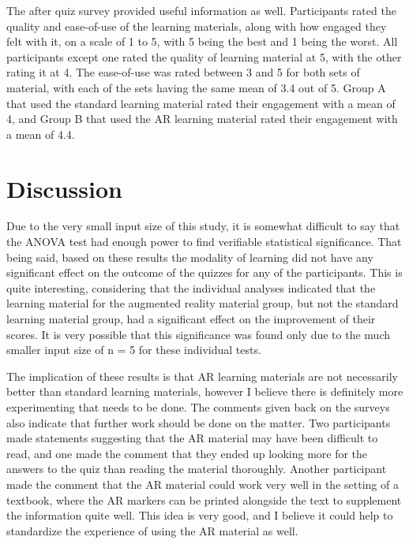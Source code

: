 \documentclass[sigconf]{acmart}
\begin{document}
The after quiz survey provided useful information as well. Participants rated the quality and ease-of-use of the learning materials, along with how engaged they felt with it, on a scale of 1 to 5, with 5 being the best and 1 being the worst. All participants except one rated the quality of learning material at 5, with the other rating it at 4. The ease-of-use was rated between 3 and 5 for both sets of material, with each of the sets having the same mean of 3.4 out of 5. Group A that used the standard learning material rated their engagement with a mean of 4, and Group B that used the AR learning material rated their engagement with a mean of 4.4.

\section{Discussion}
Due to the very small input size of this study, it is somewhat difficult to say that the ANOVA test had enough power to find verifiable statistical significance. That being said, based on these results the modality of learning did not have any significant effect on the outcome of the quizzes for any of the participants. This is quite interesting, considering that the individual analyses indicated that the learning material for the augmented reality material group, but not the standard learning material group, had a significant effect on the improvement of their scores. It is very possible that this significance was found only due to the much smaller input size of n = 5 for these individual tests.

The implication of these results is that AR learning materials are not necessarily better than standard learning materials, however I believe there is definitely more experimenting that needs to be done. The comments given back on the surveys also indicate that further work should be done on the matter. Two participants made statements suggesting that the AR material may have been difficult to read, and one made the comment that they ended up looking more for the answers to the quiz than reading the material thoroughly. Another participant made the comment that the AR material could work very well in the setting of a textbook, where the AR markers can be printed alongside the text to supplement the information quite well. This idea is very good, and I believe it could help to standardize the experience of using the AR material as well.
\end{document}
